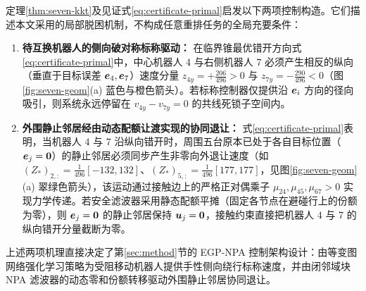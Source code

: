 \begin{remark}[七机器人见证启发的协同控制构造]\label{rem:two-conditions}
定理\ref{thm:seven-kkt}及见证式\eqref{eq:certificate-primal}启发以下两项控制构造。它们描述本文采用的局部脱困机制，不构成任意重排任务的全局充要条件：
\begin{enumerate}
 \item \textbf{待互换机器人的侧向破对称标称驱动：} 在临界锥最优错开方向式\eqref{eq:certificate-primal}中，中心机器人 $4$ 与右侧机器人 $7$ 必须产生相反的纵向（垂直于目标误差 $\boldsymbol{e}_4,\boldsymbol{e}_7$）速度分量 $z_{4y}=+\frac{206}{496}>0$ 与 $z_{7y}=-\frac{290}{496}<0$（图\ref{fig:seven-geom}(a) 蓝色与橙色箭头）。若标称控制器仅提供沿 $\boldsymbol{e}_i$ 方向的径向吸引，则系统永远停留在 $v_{4y}-v_{7y}=0$ 的共线死锁子空间内。
 \item \textbf{外围静止邻居经由动态配额让渡实现的协同退让：} 式\eqref{eq:certificate-primal}表明，当机器人 $4$ 与 $7$ 沿纵向错开时，周围五台原本已处于各自目标位置（$\boldsymbol{e}_j=\boldsymbol 0$）的静止邻居必须同步产生非零向外退让速度（如 $(Z_*)_{2,:}=\frac1{496}[-132,132]$、$(Z_*)_{5,:}=\frac1{496}[177,177]$，见图\ref{fig:seven-geom}(a) 翠绿色箭头），该运动通过接触边上的严格正对偶乘子 $\mu_{24},\mu_{45},\mu_{67}>0$ 实现力学传递。若安全滤波器采用静态配额平摊（固定各节点在避碰行上的份额为零），则 $\boldsymbol{e}_j=\boldsymbol 0$ 的静止邻居保持 $\boldsymbol{u}_j=\boldsymbol 0$，接触约束直接把机器人 $4$ 与 $7$ 的纵向错开分量截断为零。
\end{enumerate}
上述两项机理直接决定了第\ref{sec:method}节的 EGP-NPA 控制架构设计：由等变图网络强化学习策略为受阻移动机器人提供手性侧向绕行标称速度，并由闭邻域块 NPA 滤波器的动态零和份额转移驱动外围静止邻居协同退让。
\end{remark}
